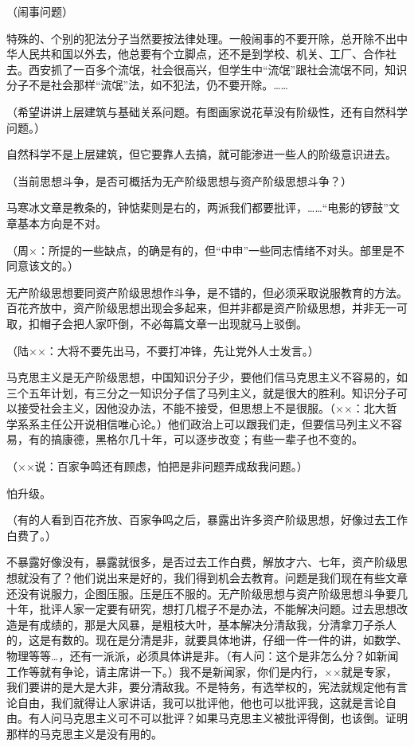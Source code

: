 （闹事问题）

特殊的、个别的犯法分子当然要按法律处理。一般闹事的不要开除，总开除不出中华人民共和国以外去，他总要有个立脚点，还不是到学校、机关、工厂、合作社去。西安抓了一百多个流氓，社会很高兴，但学生中“流氓”跟社会流氓不同，知识分子不是社会那样“流氓”法，如不犯法，仍不要开除。……

（希望讲讲上层建筑与基础关系问题。有图画家说花草没有阶级性，还有自然科学问题。）

自然科学不是上层建筑，但它要靠人去搞，就可能渗进一些人的阶级意识进去。

（当前思想斗争，是否可概括为无产阶级思想与资产阶级思想斗争？）

马寒冰文章是教条的，钟惦棐则是右的，两派我们都要批评，……“电影的锣鼓”文章基本方向是不对。

（周×：所提的一些缺点，的确是有的，但“中申”一些同志情绪不对头。部里是不同意该文的。）

无产阶级思想要同资产阶级思想作斗争，是不错的，但必须采取说服教育的方法。百花齐放中，资产阶级思想出现会多起来，但并非都是资产阶级思想，并非无一可取，扣帽子会把人家吓倒，不必每篇文章一出现就马上驳倒。

（陆××：大将不要先出马，不要打冲锋，先让党外人士发言。）

马克思主义是无产阶级思想，中国知识分子少，要他们信马克思主义不容易的，如三个五年计划，有三分之一知识分子信了马列主义，就是很大的胜利。知识分子可以接受社会主义，因他没办法，不能不接受，但思想上不是很服。（××：北大哲学系系主任公开说相信唯心论。）他们政治上可以跟我们走，但要信马列主义不容易，有的搞康德，黑格尔几十年，可以逐步改变；有些一辈子也不变的。

（××说：百家争鸣还有顾虑，怕把是非问题弄成敌我问题。）

怕升级。

（有的人看到百花齐放、百家争鸣之后，暴露出许多资产阶级思想，好像过去工作白费了。）

不暴露好像没有，暴露就很多，是否过去工作白费，解放才六、七年，资产阶级思想就没有了？他们说出来是好的，我们得到机会去教育。问题是我们现在有些文章还没有说服力，企图压服。压是压不服的。无产阶级思想与资产阶级思想斗争要几十年，批评人家一定要有研究，想打几棍子不是办法，不能解决问题。过去思想改造是有成绩的，那是大风暴，是粗枝大叶，基本解决分清敌我，分清拿刀子杀人的，这是有数的。现在是分清是非，就要具体地讲，仔细一件一件的讲，如数学、物理等等…，还有一派派，必须具体讲是非。（有人问：这个是非怎么分？如新闻工作等就有争论，请主席讲一下。）我不是新闻家，你们是内行，××就是专家，我们要讲的是大是大非，要分清敌我。不是特务，有选举权的，宪法就规定他有言论自由，我们就得让人家讲话，我可以批评他，他也可以批评我，这就是言论自由。有人问马克思主义可不可以批评？如果马克思主义被批评得倒，也该倒。证明那样的马克思主义是没有用的。

